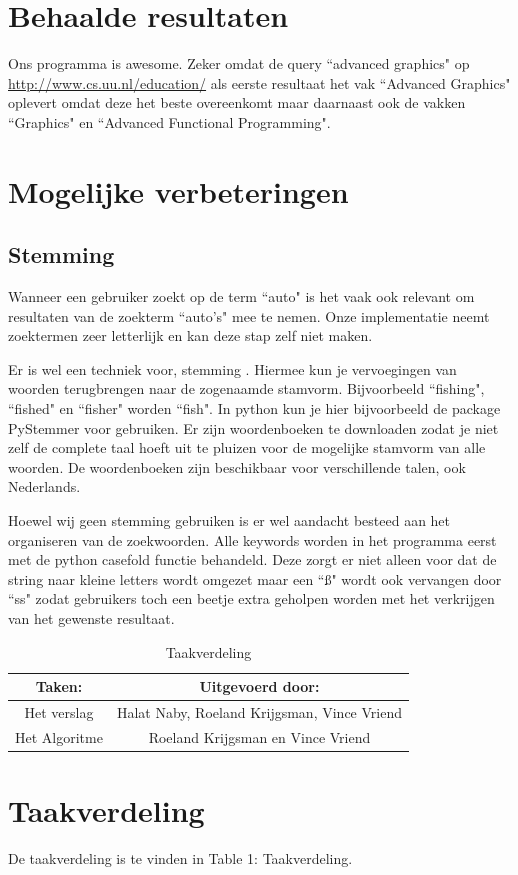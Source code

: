 \documentclass[12pt,a4paper]{article}
\begin{document}
\section{Behaalde resultaten}
Ons programma is awesome. Zeker omdat de query ``advanced graphics" op \url{http://www.cs.uu.nl/education/} als eerste resultaat het vak ``Advanced Graphics" oplevert omdat deze het beste overeenkomt maar daarnaast ook de vakken ``Graphics" en ``Advanced Functional Programming".

\section{Mogelijke verbeteringen}
\subsection{Stemming}
Wanneer een gebruiker zoekt op de term ``auto" is het vaak ook relevant om resultaten van de zoekterm ``auto's" mee te nemen. Onze implementatie neemt zoektermen zeer letterlijk en kan deze stap zelf niet maken.
\vspace{1pc}

Er is wel een techniek voor, stemming \cite{5}.  Hiermee kun je vervoegingen van woorden terugbrengen naar de zogenaamde stamvorm. Bijvoorbeeld ``fishing", ``fished" en ``fisher" worden ``fish". In python kun je hier bijvoorbeeld de package PyStemmer voor gebruiken. Er zijn woordenboeken te downloaden zodat je niet zelf de complete taal hoeft uit te pluizen voor de mogelijke stamvorm van alle woorden. De woordenboeken zijn beschikbaar voor verschillende talen, ook Nederlands.
\vspace{1pc}

Hoewel wij geen stemming gebruiken is er wel aandacht besteed aan het organiseren van de zoekwoorden. Alle keywords worden in het programma eerst met de python casefold functie behandeld. Deze zorgt er niet alleen voor dat de string naar kleine letters wordt omgezet maar een ``{\ss}" wordt ook vervangen door ``ss" zodat gebruikers toch een beetje extra geholpen worden met het verkrijgen van het gewenste resultaat.

\begin{table}
\caption{Taakverdeling}
\label{taakverdling}
\begin{center}
\begin{tabular}{|c||c|}
\hline
Taken: & Uitgevoerd door:\\
\hline
Het verslag & Halat Naby, Roeland Krijgsman, Vince Vriend\\
\hline
Het Algoritme &  Roeland Krijgsman en Vince Vriend\\
\hline
\end{tabular}
\end{center}
\end{table}

\section{Taakverdeling}
De taakverdeling is te vinden in Table 1: Taakverdeling.




\end{document}
